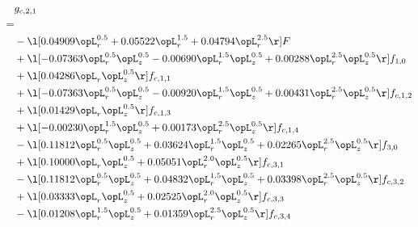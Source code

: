 \begin{alignat}{2} 
\label{eq:g_21_0} 
& g_{c,2,1} \nonumber \\ 
 = \\ 
& - \l[  0.04909 \opL_r^{0.5} +  0.05522 \opL_r^{1.5} +  0.04794 \opL_r^{2.5}  \r] F \nonumber \\ 
& + \l[  -0.07363 \opL_r^{0.5} \opL_z^{0.5}   -0.00690 \opL_r^{1.5} \opL_z^{0.5} +  0.00288 \opL_r^{2.5} \opL_z^{0.5}  \r] f_{1,0} \nonumber \\ 
& + \l[  0.04286 \opL_r \opL_z^{0.5}  \r] f_{c,1,1} \nonumber \\ 
& + \l[  -0.07363 \opL_r^{0.5} \opL_z^{0.5}   -0.00920 \opL_r^{1.5} \opL_z^{0.5} +  0.00431 \opL_r^{2.5} \opL_z^{0.5}  \r] f_{c,1,2} \nonumber \\ 
& + \l[  0.01429 \opL_r \opL_z^{0.5}  \r] f_{c,1,3} \nonumber \\ 
& + \l[  -0.00230 \opL_r^{1.5} \opL_z^{0.5} +  0.00173 \opL_r^{2.5} \opL_z^{0.5}  \r] f_{c,1,4} \nonumber \\ 
& - \l[  0.11812 \opL_r^{0.5} \opL_z^{0.5} +  0.03624 \opL_r^{1.5} \opL_z^{0.5} +  0.02265 \opL_r^{2.5} \opL_z^{0.5}  \r] f_{3,0} \nonumber \\ 
& + \l[  0.10000 \opL_r \opL_z^{0.5} +  0.05051 \opL_r^{2.0} \opL_z^{0.5}  \r] f_{c,3,1} \nonumber \\ 
& - \l[  0.11812 \opL_r^{0.5} \opL_z^{0.5} +  0.04832 \opL_r^{1.5} \opL_z^{0.5} +  0.03398 \opL_r^{2.5} \opL_z^{0.5}  \r] f_{c,3,2} \nonumber \\ 
& + \l[  0.03333 \opL_r \opL_z^{0.5} +  0.02525 \opL_r^{2.0} \opL_z^{0.5}  \r] f_{c,3,3} \nonumber \\ 
& - \l[  0.01208 \opL_r^{1.5} \opL_z^{0.5} +  0.01359 \opL_r^{2.5} \opL_z^{0.5}  \r] f_{c,3,4} \nonumber \\ 
\end{alignat} 


